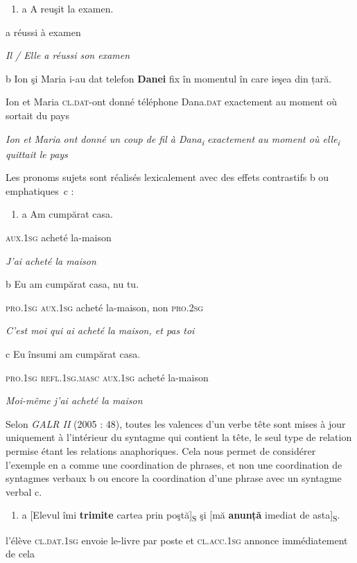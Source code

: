 \begin{enumerate}
\item \label{bkm:Ref299305264}a  A  reuşit  la  examen.


\end{enumerate}
a  réussi  à  examen

\textit{Il / Elle a réussi son examen}   

  b  Ion şi Maria i-au dat telefon \textbf{Danei} fix în momentul în care ieşea din țară.

Ion et Maria \textsc{cl.dat-}ont donné téléphone Dana.\textsc{dat} exactement au moment où sortait du pays

\textit{    Ion et Maria ont donné un coup de fil à Dana}\textit{\textsubscript{i}}\textit{ exactement au moment où elle}\textit{\textsubscript{i}}\textit{ quittait le pays}  

Les pronoms sujets sont réalisés lexicalement avec des effets contrastifs b ou emphatiques~c :


\begin{enumerate}
\item \label{bkm:Ref299305473}a  Am  cumpărat  casa.


\end{enumerate}
\textsc{aux.1sg}  acheté  la-maison

\textit{J'ai acheté la maison}   

  b  Eu  am  cumpărat  casa,  nu  tu.

\textsc{pro.1sg}  \textsc{aux.1sg}  acheté  la-maison,  non  \textsc{pro.2sg}

\textit{    C'est moi qui ai acheté la maison, et pas toi}  

  c  Eu  însumi  am  cumpărat  casa.

\textsc{pro.1sg}  \textsc{refl.1sg.masc}  \textsc{aux.1sg}  acheté  la-maison

{\itshape
    Moi-même j'ai acheté la maison}

Selon \textit{GALR II} (2005 : 48), toutes les valences d'un verbe tête sont mises à jour uniquement à l'intérieur du syntagme qui contient la tête, le seul type de relation permise étant les relations anaphoriques. Cela nous permet de considérer l'exemple en a comme une coordination de phrases, et non une coordination de syntagmes verbaux b ou encore la coordination d'une phrase avec un syntagme verbal c.


\begin{enumerate}
\item \label{bkm:Ref299305605}a  [Elevul îmi \textbf{trimite} cartea prin poştă]\textsubscript{S} şi [mă \textbf{anunță} imediat de asta]\textsubscript{S}.


\end{enumerate}
l'élève \textsc{cl.dat.1sg} envoie le-livre par poste et \textsc{cl.acc.1sg} annonce immédiatement de cela 

